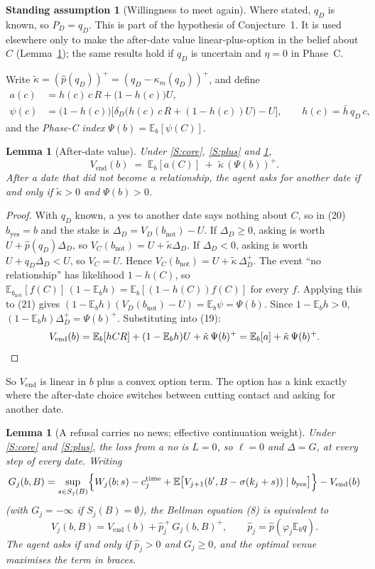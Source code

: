 \documentclass[11pt,a4paper]{article}
\newtheorem{lemma}[theorem]{Lemma}
\theoremstyle{definition}
\newtheorem{assumption}{Standing assumption}
\theoremstyle{remark}
\newcommand{\E}{\mathbb{E}}
\newcommand{\Vend}{V_{\mathrm{end}}}
\newcommand{\pp}{\hat p}
\newcommand{\kt}{\tilde\kappa}
\newcommand{\pos}[1]{\left(#1\right)^{+}}
\begin{document}
\begin{assumption}[Willingness to meet again]\label{S:qD}
Where stated, $q_D$ is known, so $P_D=q_D$. This is part of the hypothesis of Conjecture~1. It is used elsewhere only to make the after-date value linear-plus-option in the belief about $C$ (Lemma~\ref{lem:vend}); the same results hold if $q_D$ is uncertain and $\eta=0$ in Phase~C.
\end{assumption}

Write $\kt=\pos{\pp(q_D)}=\pos{q_D-\kappa_m(q_D)}$, and define
\begin{align*}
a(c)&=h(c)\,c\,R+\bigl(1-h(c)\bigr)U,\\
\psi(c)&=\bigl(1-h(c)\bigr)\bigl[\delta_D\bigl(h(c)\,c\,R+(1-h(c))U\bigr)-U\bigr],\qquad h(c)=\bar h\,q_D\,c,
\end{align*}
and the \emph{Phase-C index} $\Psi(b)=\E_b[\psi(C)]$.

\begin{lemma}[After-date value]\label{lem:vend}
Under \ref{S:core}, \ref{S:plus} and \ref{S:qD},
\[
\Vend(b)\;=\;\E_b[a(C)]\;+\;\kt\,\pos{\Psi(b)}.
\]
After a date that did not become a relationship, the agent asks for another date if and only if $\kt>0$ and $\Psi(b)>0$.
\end{lemma}

\begin{proof}
With $q_D$ known, a yes to another date says nothing about $C$, so in (20) $b_{\mathrm{yes}}=b$ and the stake is $\Delta_D=V_D(b_{\mathrm{not}})-U$. If $\Delta_D\ge0$, asking is worth $U+\pp(q_D)\Delta_D$, so $V_C(b_{\mathrm{not}})=U+\kt\Delta_D$. If $\Delta_D<0$, asking is worth $U+q_D\Delta_D<U$, so $V_C=U$. Hence $V_C(b_{\mathrm{not}})=U+\kt\,\Delta_D^{+}$. The event ``no relationship'' has likelihood $1-h(C)$, so $\E_{b_{\mathrm{not}}}[f(C)]\,(1-\E_bh)=\E_b[(1-h(C))f(C)]$ for every $f$. Applying this to (21) gives $(1-\E_bh)(V_D(b_{\mathrm{not}})-U)=\E_b\psi=\Psi(b)$. Since $1-\E_bh>0$, $(1-\E_bh)\Delta_D^{+}=\Psi(b)^{+}$. Substituting into (19):
\[
\Vend(b)=\E_b[hCR]+(1-\E_bh)U+\kt\,\Psi(b)^+=\E_b[a]+\kt\,\Psi(b)^+.\qedhere
\]
\end{proof}

So $\Vend$ is linear in $b$ plus a convex option term. The option has a kink exactly where the after-date choice switches between cutting contact and asking for another date.

\begin{lemma}[A refusal carries no news; effective continuation weight]\label{lem:core}
Under \ref{S:core} and \ref{S:plus}, the loss from a no is $L=0$, so $\ell=0$ and $\Delta=G$, at every step of every date. Writing
\[
G_j(b,B)=\sup_{s\in S_j(B)}\Bigl\{W_j(b;s)-c_j^{\mathrm{time}}+\E\bigl[V_{j+1}(b',B-\sigma(k_j+s))\mid b_{\mathrm{yes}}\bigr]\Bigr\}-\Vend(b)
\]
(with $G_j=-\infty$ if $S_j(B)=\emptyset$), the Bellman equation (8) is equivalent to
\begin{equation}\label{eq:Vj}
V_j(b,B)=\Vend(b)+\pp_j^{\,+}\,G_j(b,B)^{+},\qquad \pp_j=\pp(\varphi_j\E_b q).
\end{equation}
The agent asks if and only if $\pp_j>0$ and $G_j\ge0$, and the optimal venue maximises the term in braces.
\end{lemma}
\end{document}

